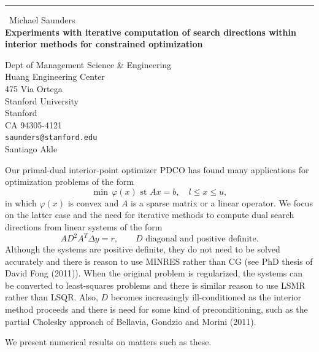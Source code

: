 \documentclass{report}
\begin{document}
\begin{center}
\rule{6in}{1pt} \
{\large Michael Saunders \\
{\bf Experiments with iterative computation of search directions within interior methods for constrained optimization}}

Dept of Management Science & Engineering \\ Huang Engineering Center \\ 475 Via Ortega \\ Stanford University \\ Stanford \\ CA 94305-4121
\\
{\tt saunders@stanford.edu}\\
Santiago Akle\end{center}

Our primal-dual interior-point optimizer PDCO has found many applications
for optimization problems of the form
\[
\min\, \varphi(x) \text{ \ st\ \ } Ax=b, \quad l \le x \le u,
\]
in which $\varphi(x)$ is convex and $A$ is a sparse matrix or a linear
operator. We focus on the latter case and the need for iterative
methods to compute dual search directions from linear systems of the
form
\[
A D^2 \!A^T \Delta y = r, \qquad \text{$D$ diagonal and positive definite}.
\]
Although the systems are positive definite, they do not need to be
solved accurately and there is reason to use MINRES rather than
CG (see PhD thesis of David Fong (2011)). When the original problem
is regularized, the systems can be converted to least-squares
problems and there is similar reason to use LSMR rather than LSQR.
Also, $D$ becomes increasingly ill-conditioned as the interior method
proceeds and there is need for some kind of preconditioning, such as
the partial Cholesky approach of Bellavia, Gondzio and Morini (2011).

We present numerical results on matters such as these.
\end{document}
